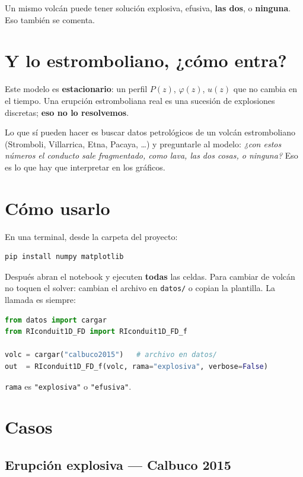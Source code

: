 \documentclass[11pt,a4paper]{article}
\begin{document}
\vspace{0.4em}
Un mismo volcán puede tener solución explosiva, efusiva, \textbf{las dos},
o \textbf{ninguna}. Eso también se comenta.

\section{Y lo estromboliano, ¿cómo entra?}

Este modelo es \textbf{estacionario}: un perfil $P(z)$, $\varphi(z)$, $u(z)$
que no cambia en el tiempo. Una erupción estromboliana real es una sucesión
de explosiones discretas; \textbf{eso no lo resolvemos}.

Lo que sí pueden hacer es buscar datos petrológicos de un volcán
estromboliano (Stromboli, Villarrica, Etna, Pacaya, \ldots) y preguntarle
al modelo: \emph{¿con estos números el conducto sale fragmentado, como lava,
las dos cosas, o ninguna?} Eso es lo que hay que interpretar en los gráficos.

\section{Cómo usarlo}

En una terminal, desde la carpeta del proyecto:
\begin{lstlisting}[language=bash]
pip install numpy matplotlib
\end{lstlisting}

Después abran el notebook y ejecuten \textbf{todas} las celdas.
Para cambiar de volcán no toquen el solver: cambian el archivo en
\texttt{datos/} o copian la plantilla. La llamada es siempre:

\begin{lstlisting}[language=Python]
from datos import cargar
from RIconduit1D_FD import RIconduit1D_FD_f

volc = cargar("calbuco2015")   # archivo en datos/
out  = RIconduit1D_FD_f(volc, rama="explosiva", verbose=False)
\end{lstlisting}

\texttt{rama} es \texttt{"explosiva"} o \texttt{"efusiva"}.

\section{Casos}

\subsection{Erupción explosiva --- Calbuco 2015}
\end{document}

